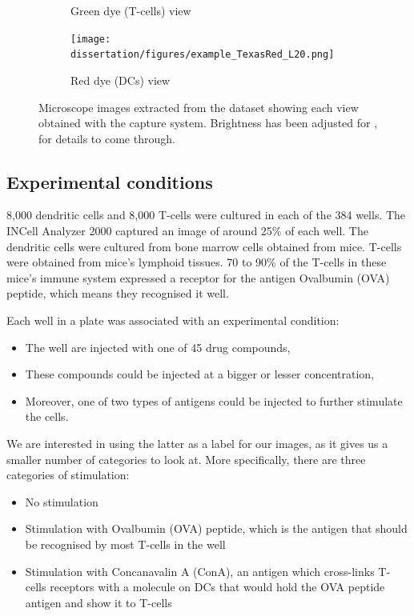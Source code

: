\begin{figure}[h]
\begin{subfigure}[h!]{0.3\textwidth}
        \caption{Green dye (T-cells) view}
        \label{fig:fov_fitc}
    \end{subfigure}
    \begin{subfigure}[h!]{0.3\textwidth}
        \texttt{[image: dissertation/figures/example\_TexasRed\_L20.png]}
        \caption{Red dye (DCs) view}
        \label{fig:fov_tr}
    \end{subfigure}
    \caption{Microscope images extracted from the dataset showing each view obtained with the capture system. Brightness has been adjusted for ,  for details to come through.}
    \label{fig:fov}
\end{figure}

\subsection{Experimental conditions}

8,000 dendritic cells and 8,000 T-cells were cultured in each of the 384 wells. The INCell Analyzer 2000 captured an image of around 25\% of each well. The dendritic cells were cultured from bone marrow cells obtained from mice. T-cells were obtained from mice's lymphoid tissues. 70 to 90\% of the T-cells in these mice's immune system expressed a receptor for the antigen Ovalbumin (OVA) peptide, which means they recognised it well.

Each well in a plate was associated with an experimental condition:
\begin{itemize}
    \item The well are injected with one of 45 drug compounds, %
    \item These compounds could be injected at a bigger or lesser concentration,
    \item Moreover, one of two types of antigens could be injected to further stimulate the cells.
\end{itemize}

We are interested in using the latter as a label for our images, as it gives us a smaller number of categories to look at. More specifically, there are three categories of stimulation:
\begin{itemize}
    \item No stimulation
    \item Stimulation with Ovalbumin (OVA) peptide, which is the antigen that should be recognised by most T-cells in the well
    \item Stimulation with Concanavalin A (ConA), an antigen which cross-links T-cells receptors with a molecule on DCs that would hold the OVA peptide antigen and show it to T-cells
\end{itemize}

